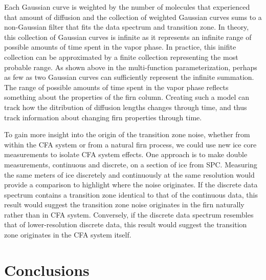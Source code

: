 \documentclass[draft, jgrga]{AGUTeX}
\begin{document}
\begin{article}
Each Gaussian curve is weighted by the number of molecules that experienced that amount of diffusion and the collection of weighted Gaussian curves sums to a non-Gaussian filter that fits the data spectrum and transition zone. In theory, this collection of Gaussian curves is infinite as it represents an infinite range of possible amounts of time spent in the vapor phase. In practice, this inifite collection can be approximated by a finite collection representing the most probable range. As shown above in the multi-function parameterization, perhaps as few as two Gaussian curves can sufficiently represent the infinite summation. The range of possible amounts of time spent in the vapor phase reflects something about the properties of the firn column. Creating such a model can track how the ditribution of diffusion lengths changes through time, and thus track information about changing firn properties through time.

To gain more insight into the origin of the transition zone noise, whether from within the CFA system or from a natural firn process, we could use new ice core measurements to isolate CFA system effects. One approach is to make double measurements, continuous and discrete, on a section of ice from SPC. Measuring the same meters of ice discretely and continuously at the same resolution would provide a comparison to highlight where the noise originates. If the discrete data spectrum contains a transition zone identical to that of the continuous data, this result would suggest the transition zone noise originates in the firn naturally rather than in CFA system. Conversely, if the discrete data spectrum resembles that of lower-resolution discrete data, this result would suggest the transition zone originates in the CFA system itself.


\section{Conclusions}


\end{article}
\end{document}
